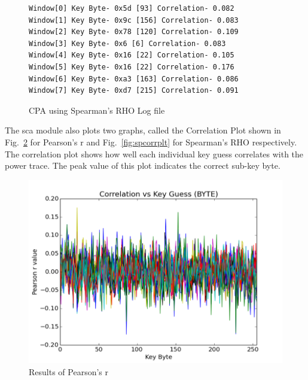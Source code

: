 \documentclass{llncs}
\numberwithin{algorithm}{chapter}
\begin{document}
\begin{figure}[h]
\begin{Verbatim}[frame=single]
Window[0] Key Byte- 0x5d [93] Correlation- 0.082
Window[1] Key Byte- 0x9c [156] Correlation- 0.083
Window[2] Key Byte- 0x78 [120] Correlation- 0.109
Window[3] Key Byte- 0x6 [6] Correlation- 0.083
Window[4] Key Byte- 0x16 [22] Correlation- 0.105
Window[5] Key Byte- 0x16 [22] Correlation- 0.176
Window[6] Key Byte- 0xa3 [163] Correlation- 0.086
Window[7] Key Byte- 0xd7 [215] Correlation- 0.091
\end{Verbatim}
\caption{\label{fig:spearman}CPA using Spearman's RHO Log file }
\end{figure}

The sca module also plots two graphs, called the Correlation Plot 
shown in Fig.~\ref{fig:prcorrplt} for Pearson's r and Fig.~\ref{fig:spcorrplt} for 
Spearman's RHO respectively.  
The correlation plot shows how well each individual key guess correlates with the power trace.
The peak value of this plot indicates the correct sub-key byte. 

\begin{figure}[h]
\begin{center}
\includegraphics[scale=0.8]{figures/pearson-r}
\caption{\label{fig:prcorrplt}Results of Pearson's r}
\end{center} 
\vspace{-3ex}
\end{figure}
\end{document}
